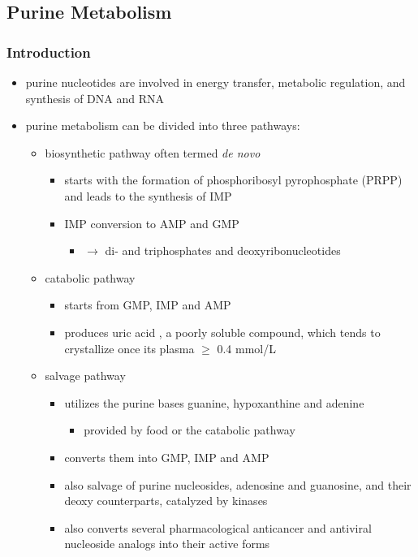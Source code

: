 \documentclass[12pt]{scrartcl}
\begin{document}
\subsection{Purine Metabolism}
\label{sec:org3ab7b92}
\subsubsection{Introduction}
\label{sec:org86f1c54}
\begin{itemize}
\item purine nucleotides are involved in energy transfer, metabolic
regulation, and synthesis of DNA and RNA
\item purine metabolism can be divided into three pathways:
\begin{itemize}
\item biosynthetic pathway often termed \emph{de novo}
\begin{itemize}
\item starts with the formation of phosphoribosyl pyrophosphate (PRPP)
and leads to the synthesis of IMP
\item IMP conversion to AMP and GMP
\begin{itemize}
\item \(\to\) di- and triphosphates and deoxyribonucleotides
\end{itemize}
\end{itemize}
\item catabolic pathway
\begin{itemize}
\item starts from GMP, IMP and AMP
\item produces uric acid , a poorly soluble compound, which tends to
crystallize once its plasma \(\ge\) 0.4 mmol/L
\end{itemize}
\item salvage pathway
\begin{itemize}
\item utilizes the purine bases guanine, hypoxanthine and adenine
\begin{itemize}
\item provided by food or the catabolic pathway
\end{itemize}
\item converts them into GMP, IMP and AMP
\item also salvage of purine nucleosides, adenosine and guanosine, and
their deoxy counterparts, catalyzed by kinases
\item also converts several pharmacological anticancer and antiviral
nucleoside analogs into their active forms
\end{itemize}
\end{itemize}


\end{itemize}
\end{document}
